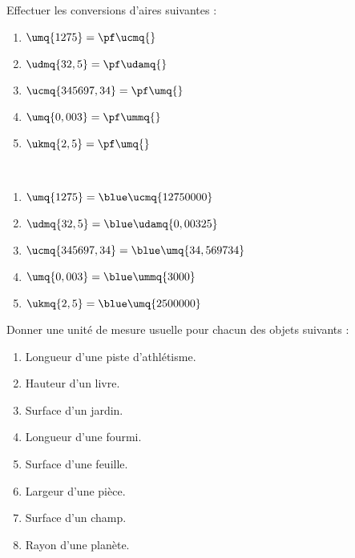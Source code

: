 \begin{colonne*exercice}
\medskip

\begin{exercice}
   Effectuer les conversions d'aires suivantes :
   \begin{enumerate}
      \item $\umq{1275} =\pf \ucmq{}$
      \item $\udmq{32,5} =\pf\udamq{}$
      \item $\ucmq{345697,34} =\pf\umq{}$
      \item $\umq{0,003} =\pf\ummq{}$
      \item $\ukmq{2,5} =\pf \umq{}$
   \end{enumerate}
\end{exercice}

\begin{corrige}
\ \\ [-5mm]
   \begin{enumerate}
      \item $\umq{1275} =\blue\ucmq{12750000}$
      \item $\udmq{32,5} =\blue\udamq{0,00325}$
      \item $\ucmq{345697,34} =\blue\umq{34,569734}$
      \item $\umq{0,003} =\blue\ummq{3000}$
      \item $\ukmq{2,5} =\blue\umq{2500000}$
   \end{enumerate}
\end{corrige}

\medskip

\begin{exercice}
   Donner une unité de mesure usuelle pour chacun des objets suivants :
   \begin{enumerate}
      \item Longueur d'une piste d'athlétisme.
      \item Hauteur d'un livre.
      \item Surface d'un jardin.
      \item Longueur d'une fourmi.
      \item Surface d'une feuille.
      \item Largeur d'une pièce.
      \item Surface d'un champ.
      \item Rayon d'une planète.
   \end{enumerate}
\end{exercice}


\end{colonne*exercice}

